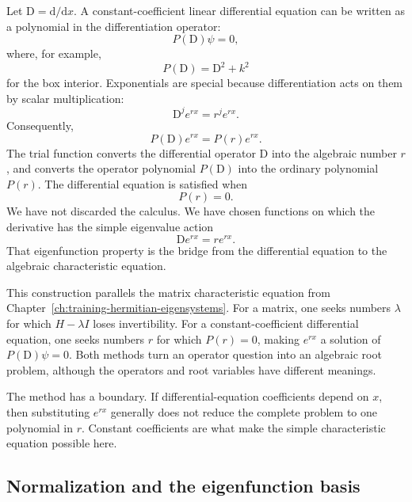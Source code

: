 Let \(\mathrm{D}=\mathrm{d}/\mathrm{d}x\). A constant-coefficient linear
differential equation can be written as a polynomial in the differentiation
operator:
\begin{equation}
  P(\mathrm{D})\psi=0,
\end{equation}
where, for example,
\begin{equation}
  P(\mathrm{D})=\mathrm{D}^2+k^2
\end{equation}
for the box interior. Exponentials are special because differentiation acts on
them by scalar multiplication:
\begin{equation}
  \mathrm{D}^j e^{rx}=r^j e^{rx}.
\end{equation}
Consequently,
\begin{equation}
  P(\mathrm{D})e^{rx}=P(r)e^{rx}.
\end{equation}
The trial function converts the differential operator \(\mathrm{D}\) into the
algebraic number \(r\), and converts the operator polynomial
\(P(\mathrm{D})\) into the ordinary polynomial \(P(r)\). The differential
equation is satisfied when
\begin{equation}
  P(r)=0.
\end{equation}
We have not discarded the calculus. We have chosen functions on which the
derivative has the simple eigenvalue action
\begin{equation}
  \mathrm{D}e^{rx}=re^{rx}.
\end{equation}
That eigenfunction property is the bridge from the differential equation to
the algebraic characteristic equation.

This construction parallels the matrix characteristic equation from
Chapter~\ref{ch:training-hermitian-eigensystems}. For a matrix, one seeks
numbers \(\lambda\) for which \(H-\lambda I\) loses invertibility. For a
constant-coefficient differential equation, one seeks numbers \(r\) for which
\(P(r)=0\), making \(e^{rx}\) a solution of \(P(\mathrm{D})\psi=0\). Both methods turn
an operator question into an algebraic root problem, although the operators and
root variables have different meanings.

The method has a boundary. If differential-equation coefficients depend on
\(x\), then substituting \(e^{rx}\) generally does not reduce the complete
problem to one polynomial in \(r\). Constant coefficients are what make the
simple characteristic equation possible here.

\subsection{Normalization and the eigenfunction basis}


